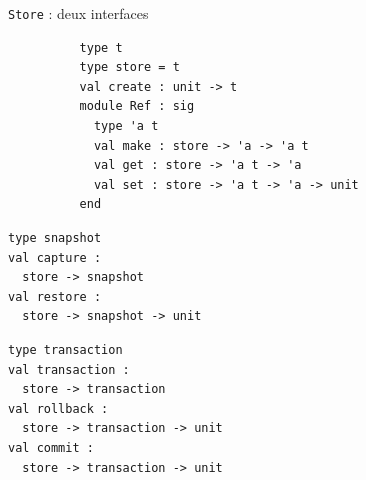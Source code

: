 \documentclass[usenames,dvipsnames]{beamer}
\begin{document}


\begin{frame}[fragile]{\texttt{Store} : deux interfaces}
\centering
\footnotesize
\begin{verbatim}
          type t
          type store = t
          val create : unit -> t
          module Ref : sig
            type 'a t
            val make : store -> 'a -> 'a t
            val get : store -> 'a t -> 'a
            val set : store -> 'a t -> 'a -> unit
          end
\end{verbatim}
\vfill
\begin{minipage}[t]{.49\textwidth}
\begin{verbatim}
type snapshot
val capture :
  store -> snapshot
val restore :
  store -> snapshot -> unit
\end{verbatim}
\end{minipage}
\hfill
\begin{minipage}[t]{.49\textwidth}
\begin{verbatim}
type transaction
val transaction :
  store -> transaction
val rollback :
  store -> transaction -> unit
val commit :
  store -> transaction -> unit
\end{verbatim}
\end{minipage}
\end{frame}
\end{document}
